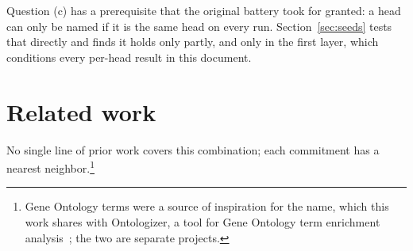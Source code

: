 \documentclass[11pt]{article}
\begin{document}
Question (c) has a prerequisite that the original battery took for
granted: a head can only be named if it is the same head on every run.
Section~\ref{sec:seeds} tests that directly and finds it holds only
partly, and only in the first layer, which conditions every per-head
result in this document.

\section{Related work}

No single line of prior work covers this combination; each commitment has
a nearest neighbor.\footnote{Gene Ontology terms were a source of
inspiration for the name, which this work shares with Ontologizer, a tool
for Gene Ontology term enrichment analysis~\cite{bauer2008}; the two are
separate projects.}
\end{document}
